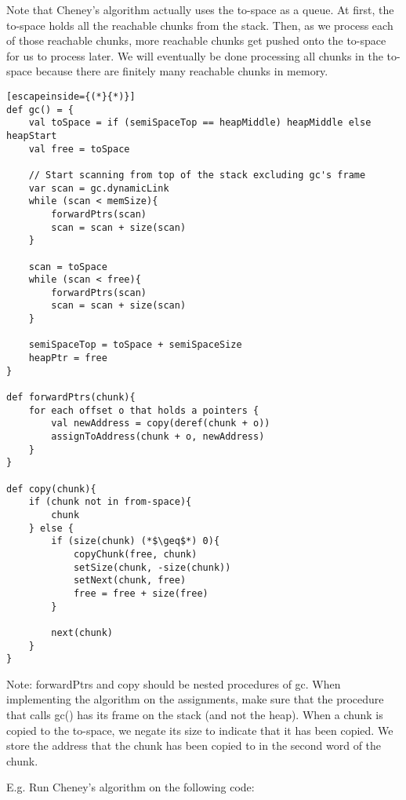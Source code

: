 \documentclass[12pt, letterpaper]{article}
\begin{document}
Note that Cheney's algorithm actually uses the to-space as a queue. At first, the to-space holds all the reachable chunks from the stack. Then, as we process each of those reachable chunks, more reachable chunks get pushed onto the to-space for us to process later. We will eventually be done processing all chunks in the to-space because there are finitely many reachable chunks in memory.\\

\begin{lstlisting}[escapeinside={(*}{*)}]
def gc() = {
	val toSpace = if (semiSpaceTop == heapMiddle) heapMiddle else heapStart
	val free = toSpace
	
	// Start scanning from top of the stack excluding gc's frame
	var scan = gc.dynamicLink
	while (scan < memSize){
		forwardPtrs(scan)
		scan = scan + size(scan)
	}
	
	scan = toSpace
	while (scan < free){
		forwardPtrs(scan)
		scan = scan + size(scan)
	}
	
	semiSpaceTop = toSpace + semiSpaceSize
	heapPtr = free
}

def forwardPtrs(chunk){
	for each offset o that holds a pointers {
		val newAddress = copy(deref(chunk + o))
		assignToAddress(chunk + o, newAddress)
	}
}

def copy(chunk){
	if (chunk not in from-space){
		chunk
	} else {
		if (size(chunk) (*$\geq$*) 0){
			copyChunk(free, chunk)
			setSize(chunk, -size(chunk))
			setNext(chunk, free)
			free = free + size(free)
		}
		
		next(chunk)
	}
}
\end{lstlisting}

Note: forwardPtrs and copy should be nested procedures of gc. When implementing the algorithm on the assignments, make sure that the procedure that calls gc() has its frame on the stack (and not the heap). When a chunk is copied to the to-space, we negate its size to indicate that it has been copied. We store the address that the chunk has been copied to in the second word of the chunk.\\

\newpage

E.g. Run Cheney's algorithm on the following code:\\
\end{document}
